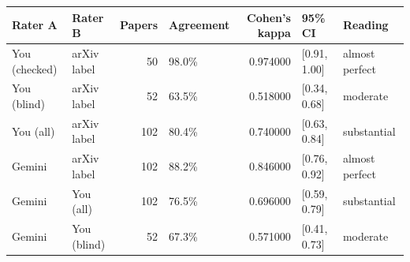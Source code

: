 \begin{tabular}{llrlrll}
\toprule
Rater A & Rater B & Papers & Agreement & Cohen's kappa & 95\% CI & Reading \\
\midrule
You (checked) & arXiv label & 50 & 98.0\% & 0.974000 & [0.91, 1.00] & almost perfect \\
You (blind) & arXiv label & 52 & 63.5\% & 0.518000 & [0.34, 0.68] & moderate \\
You (all) & arXiv label & 102 & 80.4\% & 0.740000 & [0.63, 0.84] & substantial \\
Gemini & arXiv label & 102 & 88.2\% & 0.846000 & [0.76, 0.92] & almost perfect \\
Gemini & You (all) & 102 & 76.5\% & 0.696000 & [0.59, 0.79] & substantial \\
Gemini & You (blind) & 52 & 67.3\% & 0.571000 & [0.41, 0.73] & moderate \\
\bottomrule
\end{tabular}
